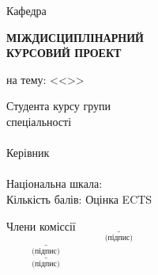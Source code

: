 \documentclass[a4paper,14pt]{extreport}
\newcommand{\wideunderline}[2][2em]{%
  \underline{\makebox[\ifdim\width>#1\width\else#1\fi]{#2}}%
}
\begin{document}
\begin{titlepage}
    \setlength\parindent{0pt}
    \centering

    \University

    \vspace{1.5ex}

    Кафедра \Department
    
    \vspace{10ex}

    \uppercase{\textbf{міждисциплінарний \\ курсовий проект}}

    \vspace{4ex}

    на тему: <<\Topic>>

    \vspace{4cm}
    \hfill
    \begin{minipage}{9cm}
        \begin{flushleft}
            
            Студента \uline{\hfill\Grade\hfill}
            курсу групи \uline{\hfill\Group\hfill} \\
            спеціальності \uline{\hfill\Speciality\hfill} \\
            \uline{\hfill\StundentName\hfill} \\
            \vspace{1ex}
            Керівник \uline{\hfill\ScientificDirectorPosition\hfill} \\
            \uline{\hfill\ScientificDirectorName\hfill} \\
            \vspace{3ex}
            Національна шкала: \uline{\hfill} \\ 
            \vspace{1ex}
            Кількість балів: \uline{\hfill} Оцінка ECTS \uline{\hfill}
        \end{flushleft}
    \end{minipage}

    \vspace{9ex}
    \hfill
    \begin{minipage}{13cm}
        \begin{flushright}
            Члени коміссії \hspace{.7cm}
            $\underset{\text{(підпис)}}{\underline{\hspace{3cm}}}$ \hspace{.5em}
            \wideunderline[10em]{\MemberCommisionF} \\
            $\underset{\text{(підпис)}}{\underline{\hspace{3cm}}}$ \hspace{.5em}
            \wideunderline[10em]{\MemberCommisionS} \\
            $\underset{\text{(підпис)}}{\underline{\hspace{3cm}}}$ \hspace{.5em}
            \wideunderline[10em]{\MemberCommisionT} \\
        \end{flushright}
    \end{minipage}
    

\end{titlepage}
\end{document}
